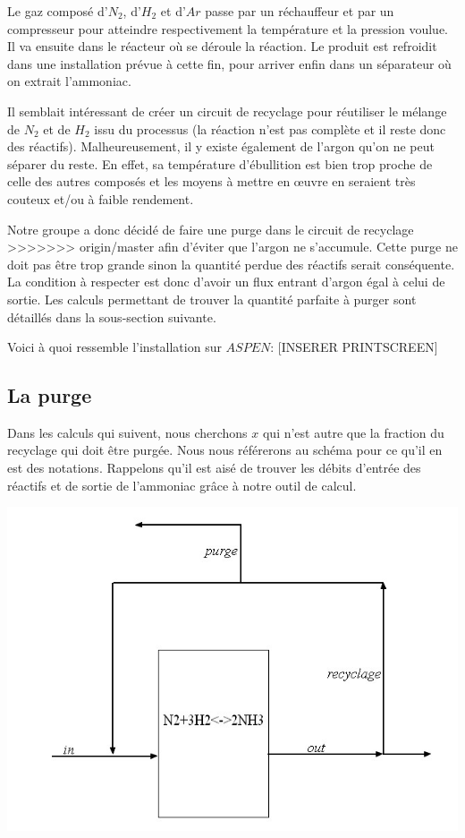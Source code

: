 \documentclass[a4paper, oneside, 12pt]{article}
\begin{document}
Le gaz composé d'$N_2$, d'$H_2$ et d'$Ar$ passe par un réchauffeur et 
par un compresseur pour atteindre respectivement la température et la pression voulue. 
Il va ensuite dans le réacteur où se déroule la réaction. 
Le produit est refroidit dans une installation prévue à cette fin, 
pour arriver enfin dans un séparateur où on extrait l'ammoniac. 

Il semblait intéressant de créer un circuit de recyclage pour réutiliser 
le mélange de $N_2$ et de $H_2$ issu du processus (la réaction n'est pas complète 
et il reste donc des réactifs). 
Malheureusement, il y existe également de l'argon qu'on ne peut séparer du reste. 
En effet, sa température d'ébullition est bien trop proche de celle des autres composés et 
les moyens à mettre en œuvre en seraient très couteux et/ou à faible rendement. 

Notre groupe a donc décidé de faire une purge dans le circuit de recyclage 
>>>>>>> origin/master
afin d'éviter que l'argon ne s'accumule. Cette purge ne doit pas être trop grande 
sinon la quantité perdue des réactifs serait conséquente. 
La condition à respecter est donc d'avoir un flux entrant d'argon égal à celui de sortie. 
Les calculs permettant de trouver la quantité parfaite à purger 
sont détaillés dans la sous-section suivante.

Voici à quoi ressemble l'installation sur $ASPEN$:
[INSERER PRINTSCREEN]

\subsection{La purge}

Dans les calculs qui suivent, nous cherchons $x$ qui n'est autre que la fraction du recyclage 
qui doit être purgée. Nous nous référerons au schéma pour ce qu'il en est des notations. 
Rappelons qu'il est aisé de trouver les débits d'entrée des réactifs 
et de sortie de l'ammoniac grâce à notre outil de calcul.

\includegraphics[scale=0.5]{etape_finale_simpl.jpg} 
\end{document}
